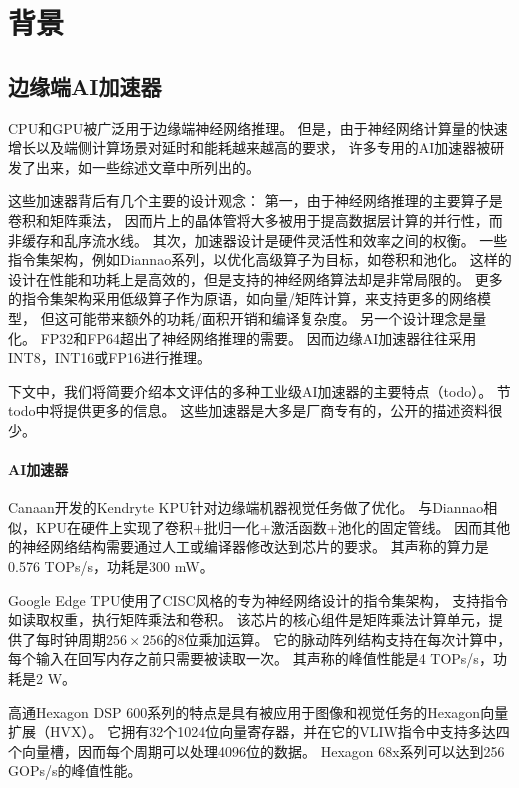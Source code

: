 \section{背景}
\label{background}

\subsection{边缘端AI加速器}
CPU和GPU被广泛用于边缘端神经网络推理。
但是，由于神经网络计算量的快速增长以及端侧计算场景对延时和能耗越来越高的要求，
许多专用的AI加速器被研发了出来，如一些综述文章\cite{chen2020survey, reuther2019survey}中所列出的。

这些加速器背后有几个主要的设计观念：
第一，由于神经网络推理的主要算子是卷积和矩阵乘法，
因而片上的晶体管将大多被用于提高数据层计算的并行性，而非缓存和乱序流水线\cite{jouppi2018domain}。
其次，加速器设计是硬件灵活性和效率之间的权衡。
一些指令集架构，例如Diannao系列\cite{chen2014diannao}，以优化高级算子为目标，如卷积和池化。
这样的设计在性能和功耗上是高效的，但是支持的神经网络算法却是非常局限的。
更多的指令集架构采用低级算子作为原语，如向量/矩阵计算，来支持更多的网络模型，
但这可能带来额外的功耗/面积开销\cite{liu2016cambricon}和编译复杂度。
另一个设计理念是量化。
FP32和FP64超出了神经网络推理的需要\cite{hennessy2019new}。
因而边缘AI加速器往往采用INT8，INT16或FP16进行推理。

下文中，我们将简要介绍本文评估的多种工业级AI加速器的主要特点（todo）。
节todo中将提供更多的信息。
这些加速器是大多是厂商专有的，公开的描述资料很少。

\paragraph{AI加速器}
Canaan开发的Kendryte KPU\cite{k210}针对边缘端机器视觉任务做了优化。
与Diannao相似，KPU在硬件上实现了卷积+批归一化+激活函数+池化的固定管线。
因而其他的神经网络结构需要通过人工或编译器修改达到芯片的要求。
其声称的算力是0.576 TOPs/s，功耗是300 mW。

Google Edge TPU\cite{jouppi2018domain}使用了CISC风格的专为神经网络设计的指令集架构，
支持指令如读取权重，执行矩阵乘法和卷积。
该芯片的核心组件是矩阵乘法计算单元，提供了每时钟周期$256\times 256$的8位乘加运算。
它的脉动阵列结构\cite{kung1979systolic}支持在每次计算中，每个输入在回写内存之前只需要被读取一次。
其声称的峰值性能是4 TOPs/s，功耗是2 W。

高通Hexagon DSP 600系列\cite{dsp}的特点是具有被应用于图像和视觉任务的Hexagon向量扩展（HVX）。
它拥有32个1024位向量寄存器，并在它的VLIW指令中支持多达四个向量槽，因而每个周期可以处理4096位的数据。
Hexagon 68x系列可以达到256 GOPs/s的峰值性能。

